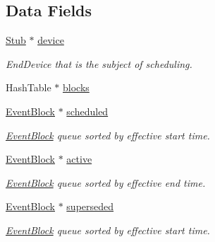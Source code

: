 \subsection*{Data Fields}
\begin{DoxyCompactItemize}
\item 
\mbox{\label{structSchedule_a84dd5004f63caca72fcd30ef9b090ca5}} 
\hyperlink{structStub}{Stub} $\ast$ \hyperlink{structSchedule_a84dd5004f63caca72fcd30ef9b090ca5}{device}
\begin{DoxyCompactList}\small\item\em End\+Device that is the subject of scheduling. \end{DoxyCompactList}\item 
Hash\+Table $\ast$ \hyperlink{structSchedule_ac21659f7ad23db734ff12a5818fbfe30}{blocks}
\item 
\mbox{\label{structSchedule_aedb5f95618e961c0f40d833179c0cb3d}} 
\hyperlink{structEventBlock}{Event\+Block} $\ast$ \hyperlink{structSchedule_aedb5f95618e961c0f40d833179c0cb3d}{scheduled}
\begin{DoxyCompactList}\small\item\em \hyperlink{structEventBlock}{Event\+Block} queue sorted by effective start time. \end{DoxyCompactList}\item 
\mbox{\label{structSchedule_a8c2ee1e7008d59ecdd7b5e85c7bbc4e5}} 
\hyperlink{structEventBlock}{Event\+Block} $\ast$ \hyperlink{structSchedule_a8c2ee1e7008d59ecdd7b5e85c7bbc4e5}{active}
\begin{DoxyCompactList}\small\item\em \hyperlink{structEventBlock}{Event\+Block} queue sorted by effective end time. \end{DoxyCompactList}\item 
\mbox{\label{structSchedule_a0a22398acd5a70aade763e2d9832e31a}} 
\hyperlink{structEventBlock}{Event\+Block} $\ast$ \hyperlink{structSchedule_a0a22398acd5a70aade763e2d9832e31a}{superseded}
\begin{DoxyCompactList}\small\item\em \hyperlink{structEventBlock}{Event\+Block} queue sorted by effective start time. \end{DoxyCompactList}\end{DoxyCompactItemize}


